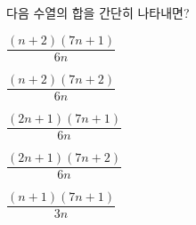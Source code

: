 \hspace*{2mm}\begin{minipage}[t]{\dimexpr\linewidth-2mm\relax}\vspace{0pt}
다음 수열의 합을 간단히 나타내면? 
\begin{choicesii}{\rule[-3ex]{0pt}{8ex}$\dfrac{(n+2)(7n+1)}{6n}$}{\rule[-3ex]{0pt}{8ex}$\dfrac{(n+2)(7n+2)}{6n}$}{\rule[-3ex]{0pt}{8ex}$\dfrac{(2n+1)(7n+1)}{6n}$}{\rule[-3ex]{0pt}{8ex}$\dfrac{(2n+1)(7n+2)}{6n}$}{\rule[-3ex]{0pt}{8ex}$\dfrac{(n+1)(7n+1)}{3n}$}\end{choicesii}\end{minipage}
